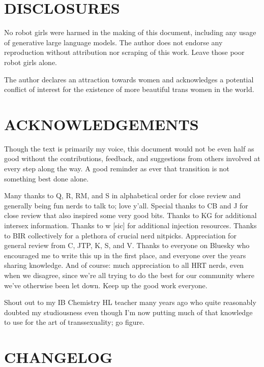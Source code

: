 \documentclass{article}
\begin{document}
{{ 

\section*{DISCLOSURES}

No robot girls were harmed in the making of this document, including any usage of generative large language models. The author does not endorse any reproduction without attribution nor scraping of this work. Leave those poor robot girls alone.

The author declares an attraction towards women and acknowledges a potential conflict of interest for the existence of more beautiful trans women in the world.

 

\section*{ACKNOWLEDGEMENTS}

Though the text is primarily my voice, this document would not be even half as good without the contributions, feedback, and suggestions from others involved at every step along the way. A good reminder as ever that transition is not something best done alone.

Many thanks to Q, R, RM, and S in alphabetical order for close review and generally being fun nerds to talk to; love y’all. Special thanks to CB and J for close review that also inspired some very good bits. Thanks to KG for additional intersex information. Thanks to w [sic] for additional injection resources. Thanks to BIR collectively for a plethora of crucial nerd nitpicks. Appreciation for general review from C, JTP, K, S, and V. Thanks to everyone on Bluesky who encouraged me to write this up in the first place, and everyone over the years sharing knowledge. And of course: much appreciation to all HRT nerds, even when we disagree, since we’re all trying to do the best for our community where we’ve otherwise been let down. Keep up the good work everyone. 

Shout out to my IB Chemistry HL teacher many years ago who quite reasonably doubted my studiousness even though I’m now putting much of that knowledge to use for the art of transsexuality; go figure. 

 

\section*{CHANGELOG}

}}
\end{document}
